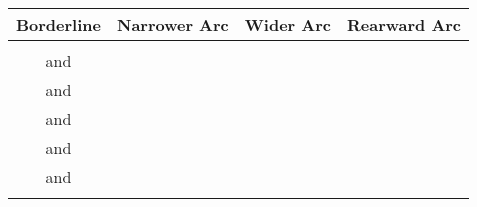 \begin{twocolumntablefloat}
\begin{twocolumntable}
\small
\begin{tabularx}{0.7\linewidth}{CCCC}
\toprule
Borderline&Narrower Arc&Wider Arc&Rearward Arc\\
\midrule
{}                                &\phantom{0}&\phantom{0}&\phantom{0}\\
\phantom{0} and \phantom{0}&\phantom{0}&\phantom{0}&\phantom{0}\\
\phantom{0} and \phantom{0}&\phantom{0}&\phantom{0}&\phantom{0}\\
\phantom{0} and \phantom{}&\phantom{0}&\phantom{}&\phantom{0}\\
\phantom{} and \phantom{}&\phantom{}&\phantom{}&\phantom{}\\
\phantom{} and \phantom{}&\phantom{}&\phantom{}&\phantom{}\\
                              &\phantom{}&\phantom{}&\phantom{}\\
\bottomrule
\end{tabularx}

\end{twocolumntable}


\end{twocolumntablefloat}
